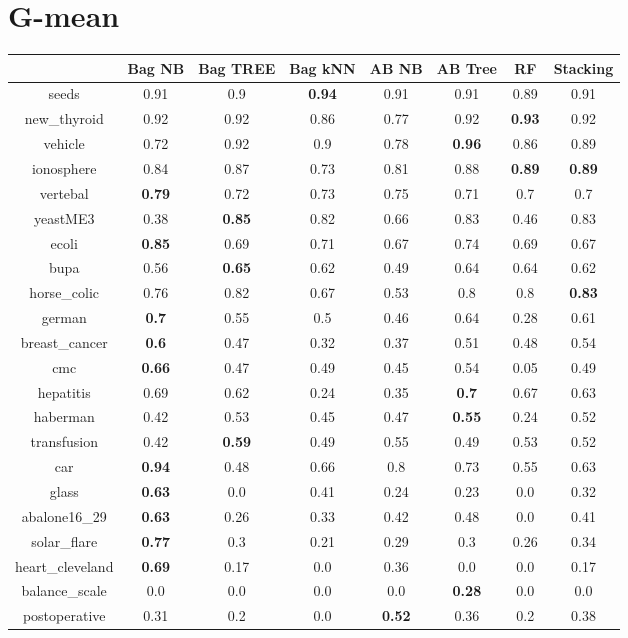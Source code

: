 \documentclass{article}%
\begin{document}
\section*{G{-}mean}%
\begin{tabular}{c|ccccccc}%
&Bag NB&Bag TREE&Bag kNN&AB NB&AB Tree&RF&Stacking\\%
\hline%
seeds&0.91&0.9&\textbf{0.94}&0.91&0.91&0.89&0.91\\%
new\_thyroid&0.92&0.92&0.86&0.77&0.92&\textbf{0.93}&0.92\\%
vehicle&0.72&0.92&0.9&0.78&\textbf{0.96}&0.86&0.89\\%
ionosphere&0.84&0.87&0.73&0.81&0.88&\textbf{0.89}&\textbf{0.89}\\%
vertebal&\textbf{0.79}&0.72&0.73&0.75&0.71&0.7&0.7\\%
yeastME3&0.38&\textbf{0.85}&0.82&0.66&0.83&0.46&0.83\\%
ecoli&\textbf{0.85}&0.69&0.71&0.67&0.74&0.69&0.67\\%
bupa&0.56&\textbf{0.65}&0.62&0.49&0.64&0.64&0.62\\%
horse\_colic&0.76&0.82&0.67&0.53&0.8&0.8&\textbf{0.83}\\%
german&\textbf{0.7}&0.55&0.5&0.46&0.64&0.28&0.61\\%
breast\_cancer&\textbf{0.6}&0.47&0.32&0.37&0.51&0.48&0.54\\%
cmc&\textbf{0.66}&0.47&0.49&0.45&0.54&0.05&0.49\\%
hepatitis&0.69&0.62&0.24&0.35&\textbf{0.7}&0.67&0.63\\%
haberman&0.42&0.53&0.45&0.47&\textbf{0.55}&0.24&0.52\\%
transfusion&0.42&\textbf{0.59}&0.49&0.55&0.49&0.53&0.52\\%
car&\textbf{0.94}&0.48&0.66&0.8&0.73&0.55&0.63\\%
glass&\textbf{0.63}&0.0&0.41&0.24&0.23&0.0&0.32\\%
abalone16\_29&\textbf{0.63}&0.26&0.33&0.42&0.48&0.0&0.41\\%
solar\_flare&\textbf{0.77}&0.3&0.21&0.29&0.3&0.26&0.34\\%
heart\_cleveland&\textbf{0.69}&0.17&0.0&0.36&0.0&0.0&0.17\\%
balance\_scale&0.0&0.0&0.0&0.0&\textbf{0.28}&0.0&0.0\\%
postoperative&0.31&0.2&0.0&\textbf{0.52}&0.36&0.2&0.38\\%
\end{tabular}

%
\end{document}

